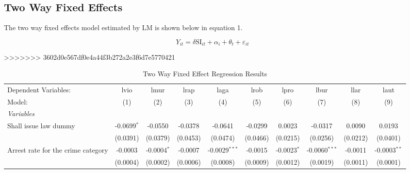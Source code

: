 \documentclass{article}
\begin{document}
\subsection*{Two Way Fixed Effects}

The two way fixed effects model estimated by LM is shown below in equation 1.

\begin{equation}
Y_{it} = \delta\text{SI}_{it} + \alpha_i + \theta_t + \varepsilon_{it}
\end{equation}


>>>>>>> 3602d0e567df0e4a44f3b272a2e3f6d7e5770421
    \scriptsize
\begin{landscape}
\begin{longtable}{@{\extracolsep{5pt}}lccccccccc}
  \caption{Two Way Fixed Effect Regression Results} 
  \label{tab:twfe}
   \tabularnewline \midrule \midrule
   Dependent Variables: & lvio                          & lmur                    & lrap                          & laga                         & lrob                        & lpro                         & lbur                    & llar                          & laut\\  
   Model:               & (1)                           & (2)                     & (3)                           & (4)                          & (5)                         & (6)                          & (7)                     & (8)                           & (9)\\  
   \midrule
   \emph{Variables}\\
   Shall issue law dummy               & -0.0699$^{*}$                 & -0.0550                 & -0.0378                       & -0.0641                      & -0.0299                     & 0.0023                       & -0.0317                 & 0.0090                        & 0.0193\\   
                        & (0.0391)                      & (0.0379)                & (0.0453)                      & (0.0474)                     & (0.0466)                    & (0.0215)                     & (0.0256)                & (0.0212)                      & (0.0401)\\
Arrest rate for the crime category & -0.0003 & -0.0004$^{*}$ & -0.0007 & -0.0029$^{***}$ & -0.0015& -0.0023$^{*}$ &  -0.0060$^{***}$& -0.0011 &-0.0003$^{**}$\\
 & (0.0004)&(0.0002) &(0.0006) & (0.0008)&(0.0009)& (0.0012)& (0.0019)& (0.0011)& (0.0001)\\   

\end{longtable}
\end{landscape}
\end{document}
